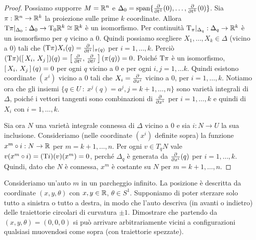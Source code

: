 \begin{proof}
	Possiamo supporre $M=\mathbb R^n$ e $\Delta_0=\mathrm{span}\{\frac{\partial }{\partial t^1}(0),\ldots,\frac{\partial }{\partial t^k}(0)\}$. Sia $\pi:\mathbb R^n\to\mathbb R^k$ la proiezione sulle prime $k$ coordinate. Allora $\mathrm T\pi|_{\Delta_0}:\Delta_0\to \mathrm T_0\mathbb R^k\cong \mathbb R^k$ è un isomorfismo.
	Per continuità $\mathrm T_\pi|_{\Delta_q}:\Delta_q\to\mathbb R^k $ è un isomorfismo per $q$ vicino a 0.
	Quindi possiamo scegliere $X_1,\ldots,X_k\in\Delta$ (vicino a 0) tali che $(\mathrm T\pi)X_i(q) = \frac{\partial }{\partial t^i}|_{\pi(q)}$ per $i=1,\ldots, k$.
	Perciò $(\mathrm T\pi)(\left[\,X_i,\,X_j\,\right])(q) = \left[\,\frac{\partial }{\partial t^i},\,\frac{\partial }{\partial t^j}\,\right](\pi(q))=0$.
	Poiché $\mathrm T\pi$ è un isomorfismo, $\left[\,X_i,\,X_j\,\right](q)=0$ per ogni $q$ vicino a 0 e per ogni $i,j=1,...k$.
	Quindi esistono coordinate $(x^i)$ vicino a 0 tali che $X_i = \frac{\partial }{\partial x^i}$ vicino a 0, per $i=1,\ldots,k$.
	Notiamo ora che gli insiemi $\{q\in U\ : \ x^j(q)=a^j, j=k+1,\ldots,n\}$ sono varietà integrali di $\Delta$, poiché i vettori tangenti sono combinazioni di $\frac{\partial }{\partial x^i}$ per $i=1,\ldots,k$ e quindi di $X_i$ con $i=1,\ldots,k$.
	
	Sia ora $N$ una varietà integrale connessa di $\Delta$ vicino a 0 e sia $i:N\to U$ la sua inclusione. Consideriamo (nelle coordinate $(x^i)$ definite sopra) la funzione $x^m\circ i:N\to \mathbb R$ per $m=k+1,\ldots,n$. Per ogni $v\in T_qN$ vale $v(x^m\circ i) = (\mathrm T i)(v)(x^m)=0$, perché $\Delta_q$ è generata da $\frac{\partial }{\partial x^i}(q)$ per $i=1,\ldots,k$. Quindi, dato che $N$ è connessa, $x^m$ è costante su $N$ per $m=k+1,\ldots,n$.
\end{proof}

\begin{exercise} [Parcheggio]
	Consideriamo un'auto $m$ in un parcheggio infinito. La posizione è descritta da coordinate $(x,y,\theta)$ con $x,y\in\mathbb R$, $\theta\in S^1$.
	Supponiamo di poter sterzare solo tutto a sinistra o tutto a destra, in modo che l'auto descriva (in avanti o indietro) delle traiettorie circolari di curvatura $\pm 1$.
	Dimostrare che partendo da $(x,y,\theta)=(0,0,0)$ si può arrivare arbitrariamente vicini a configurazioni qualsiasi muovendosi come sopra (con traiettorie spezzate).
\end{exercise}


